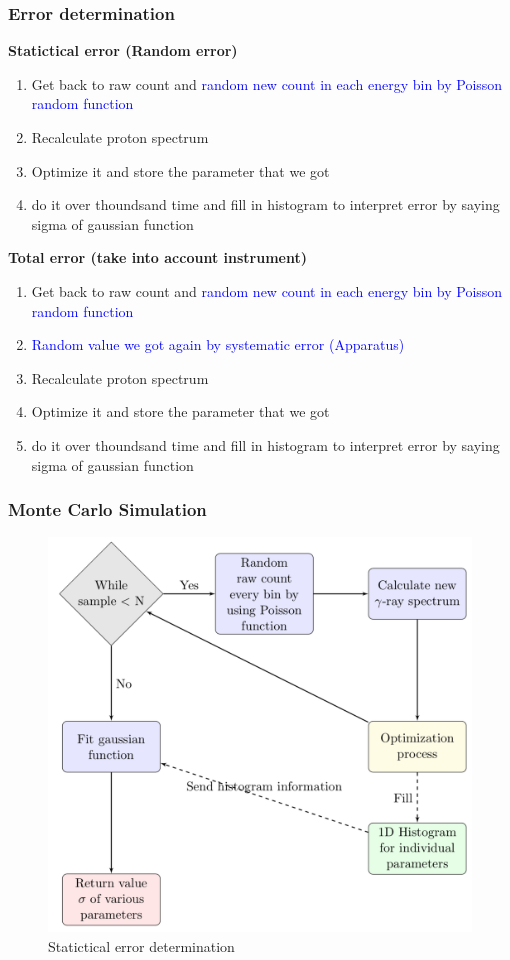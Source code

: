 \documentclass{beamer}
\begin{document}
\begin{frame}
  \frametitle{Error determination}
  \textbf{Statictical error (Random error)}
  \begin{enumerate}
    \item Get back to raw count and
    \textcolor{blue}{random new count in each energy bin by Poisson random function}
    \item Recalculate proton spectrum
    \item Optimize it and store the parameter that we got
    \item do it over thoundsand time and fill in histogram to interpret error by saying sigma of gaussian function
  \end{enumerate}
  \textbf{Total error (take into account instrument)}
  \begin{enumerate}
    \item Get back to raw count and
    \textcolor{blue}{random new count in each energy bin by Poisson random function}
    \item \textcolor{blue}{Random value we got again by systematic error (Apparatus)}
    \item Recalculate proton spectrum
    \item Optimize it and store the parameter that we got
    \item do it over thoundsand time and fill in histogram to interpret error by saying sigma of gaussian function
  \end{enumerate}
  \end{frame}
  
  \begin{frame}\frametitle{Monte Carlo Simulation}
    \begin{figure}[h!]
      \includegraphics[width=0.7\textheight]{montestat}
      \caption{Statictical error determination}
      \end{figure}
  \end{frame}
\end{document}
